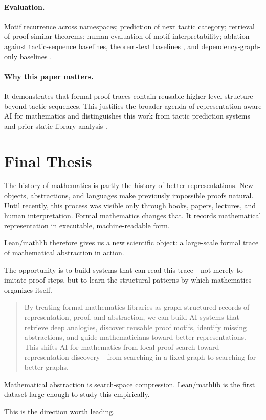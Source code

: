 \documentclass[12pt, a4paper]{article}
\begin{document}
\paragraph{Evaluation.}
Motif recurrence across namespaces; prediction of next tactic category;
retrieval of proof-similar theorems; human evaluation of motif
interpretability; ablation against tactic-sequence baselines, theorem-text
baselines \citep{gao2024leansearch}, and dependency-graph-only baselines
\citep{huch2022}.

\paragraph{Why this paper matters.}
It demonstrates that formal proof traces contain reusable higher-level
structure beyond tactic sequences. This justifies the broader agenda of
representation-aware AI for mathematics and distinguishes this work from
tactic prediction systems \citep{lample2022hypertree, yang2023leandojo} and
prior static library analysis \citep{huch2022, blanchette2015mining}.

\section{Final Thesis}

The history of mathematics is partly the history of better representations.
New objects, abstractions, and languages make previously impossible proofs
natural. Until recently, this process was visible only through books, papers,
lectures, and human interpretation. Formal mathematics changes that. It
records mathematical representation in executable, machine-readable form.

Lean/mathlib \citep{mathlib2020} therefore gives us a new scientific object:
a large-scale formal trace of mathematical abstraction in action.

The opportunity is to build systems that can read this trace---not merely to
imitate proof steps, but to learn the structural patterns by which mathematics
organizes itself.

\begin{quote}
By treating formal mathematics libraries as graph-structured records of
representation, proof, and abstraction, we can build AI systems that retrieve
deep analogies, discover reusable proof motifs, identify missing abstractions,
and guide mathematicians toward better representations. This shifts AI for
mathematics from local proof search toward representation discovery---from
searching in a fixed graph to searching for better graphs.
\end{quote}

Mathematical abstraction is search-space compression. Lean/mathlib is the
first dataset large enough to study this empirically.

This is the direction worth leading.



\end{document}
